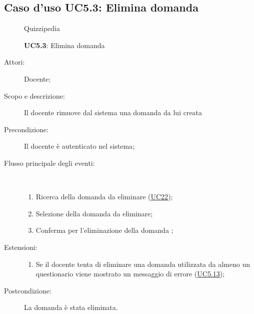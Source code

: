 \subsection{Caso d'uso UC5.3: Elimina domanda}
	\begin{figure}[H]
		\centering
		\begin{resizedtikzpicture}{\textwidth}
		\begin{umlsystem}[x=0, fill=lightgray!20]{Quizzipedia}
		\end{umlsystem}
		\end{resizedtikzpicture}
		\caption{\textbf{UC5.3}: Elimina domanda}
		\label{UC5.3}
	\end{figure}
\begin{description}
\item[Attori:] Docente;
\item[Scopo e descrizione:] Il docente rimuove dal sistema una domanda da lui creata
      \item[Precondizione:] Il docente è autenticato nel sistema;

        \item[Flusso principale degli eventi:] \ 
 \begin{enumerate}
          \item Ricerca della domanda da eliminare (\hyperlink{UC22}{UC22});
          \item Selezione della domanda da eliminare;
          \item Conferma per l'eliminazione della domanda	;

      \end{enumerate}
    \item[Estensioni:]
      \begin{enumerate}
          \item Se il docente tenta di eliminare una domanda utilizzata da almeno un questionario viene mostrato un messaggio di errore (\hyperlink{UC5.13}{UC5.13});

      \end{enumerate}
    \item[Postcondizione:] La domanda è stata eliminata.
  \end{description}
\hypertarget{UC5.4}{}
